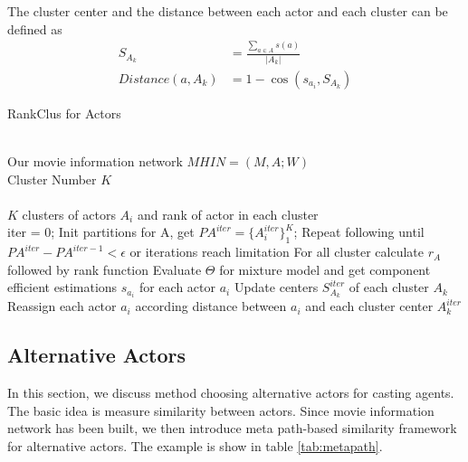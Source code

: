The cluster center and the distance between each actor and each cluster can be defined as
\begin{subequations}
\begin{align}
  S_{A_k} &= \frac{\sum_{a \in A}s(a)}{|A_k|} \\
  Distance(a, A_k) &= 1-\cos(s_{a_i}, S_{A_k})
\end{align}
\end{subequations}

\begin{algorithm}[htb]
\renewcommand{\algorithmicrequire}{\textbf{Input:}}
\renewcommand\algorithmicensure {\textbf{Output:} }
\caption{RankClus for Actors}

\begin{algorithmic}[1]

\REQUIRE ~~\\
Our movie information network $MHIN=(M, A; W)$\\
Cluster Number $K$\\

\ENSURE ~~\\
$K$ clusters of actors $A_i$ and rank of actor in each cluster \\
\STATE iter = 0;
\STATE Init partitions for A, get $PA^{iter}=\{A_i^{iter}\}_1^K$;
\STATE Repeat following until $PA^{iter}-PA^{iter-1}<\epsilon$ or iterations reach limitation
\STATE \quad For all cluster calculate $r_A$ followed by rank function
\STATE \quad Evaluate $\Theta$ for mixture model and get component efficient estimations $s_{a_i}$ for each actor $a_i$
\STATE \quad Update centers $S_{A_k}^{iter}$ of each cluster $A_k$
\STATE \quad Reassign each actor $a_i$ according distance between $a_i$ and each cluster center $A_k^{iter}$
\end{algorithmic}
\end{algorithm}


\subsection{Alternative Actors}
In this section, we discuss method choosing alternative actors for casting agents. The basic idea is measure similarity between actors. Since movie information network has been built, we then introduce meta path-based similarity framework for alternative actors. The example is show in table \ref{tab:metapath}.

